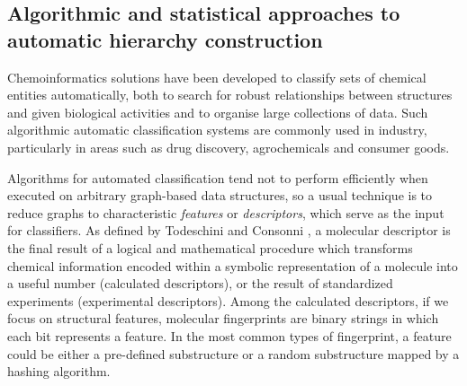 \documentclass[10pt]{bmc_article}
\newenvironment{bmcformat}{\baselineskip20pt\sloppy\setboolean{publ}{false}}{\baselineskip20pt\sloppy}
\begin{document}
\begin{bmcformat}
\subsection*{Algorithmic and statistical approaches to automatic hierarchy construction}
\label{sec:resultscheminf}


Chemoinformatics solutions have been developed to classify sets of chemical entities automatically, both to search for robust relationships between structures and given biological activities and to organise large collections of data. Such algorithmic automatic classification systems are commonly used in industry, particularly in areas such as drug discovery, agrochemicals and consumer goods.  

Algorithms for automated classification tend not to perform efficiently when executed on arbitrary graph-based data structures, so a usual technique is to reduce graphs to characteristic \textit{features} or \textit{descriptors}, which serve as the input for classifiers. As defined by Todeschini and Consonni \cite{Todeschini2000}, a molecular descriptor is the final result of a logical and mathematical procedure which transforms chemical information encoded within a symbolic representation of a molecule into a useful number (calculated descriptors), or the result of standardized experiments (experimental descriptors). Among the calculated descriptors, if we focus on structural features, molecular fingerprints are binary strings in which each bit represents a feature.  In the most common types of fingerprint, a feature could be either a pre-defined substructure or a random substructure mapped by a hashing algorithm.


\end{bmcformat}
\end{document}

